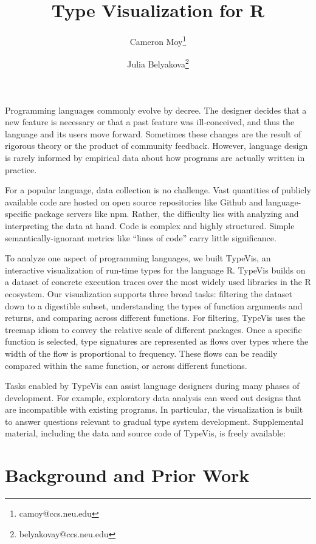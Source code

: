 \documentclass{vgtc}                          %
\title{Type Visualization for R}
\author{Cameron Moy\thanks{camoy@ccs.neu.edu}
\and Julia Belyakova\thanks{belyakovay@ccs.neu.edu}}
\affiliation{\scriptsize Northeastern University}
\begin{document}

\maketitle

Programming languages commonly evolve by decree. The designer
decides that a new feature is necessary or that a past feature was
ill-conceived, and thus the language and its users move forward.
Sometimes these changes are the result of rigorous theory
or the product of community feedback. However, language design is
rarely informed by empirical data about how programs are actually
written in practice.

For a popular language, data collection is no challenge. Vast
quantities of publicly available code are hosted on open source
repositories like Github and language-specific package servers like npm.
Rather, the difficulty lies with analyzing and interpreting the data
at hand. Code is complex and highly structured. Simple
semantically-ignorant metrics like ``lines of code''
carry little significance.

To analyze one aspect of programming languages, we built {\sc TypeVis},
an interactive visualization of run-time types for the language R.
{\sc TypeVis} builds on a dataset of concrete execution traces
over the most widely used libraries in the R ecosystem.
Our visualization supports three broad tasks:
filtering the dataset down to a digestible subset,
understanding the types of function arguments and returns,
and comparing across different functions.
For filtering, {\sc TypeVis} uses the treemap idiom
to convey the relative scale of different packages.
Once a specific function is selected,
type signatures are represented as flows over types
where the width of the flow is proportional to frequency.
These flows can be readily compared within the same function,
or across different functions.

Tasks enabled by {\sc TypeVis} can assist language designers
during many phases of development.
For example, exploratory data analysis can weed out designs that
are incompatible with existing programs.
In particular, the visualization is built to answer questions
relevant to gradual type system development.
Supplemental material, including the data and source code of
{\sc TypeVis}, is freely available: 


\section{Background and Prior Work}
\end{document}
